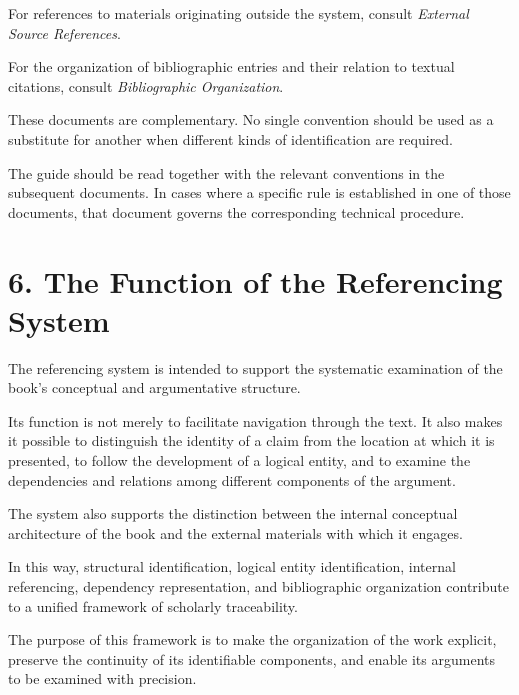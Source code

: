 For references to materials originating
outside the system, consult
\textit{External Source References}.

For the organization of bibliographic
entries and their relation to textual
citations, consult
\textit{Bibliographic Organization}.

These documents are complementary.
No single convention should be used
as a substitute for another when
different kinds of identification
are required.

The guide should be read together
with the relevant conventions in
the subsequent documents. In cases
where a specific rule is established
in one of those documents, that
document governs the corresponding
technical procedure.


\section*{6. The Function of the Referencing System}

The referencing system is intended
to support the systematic examination
of the book's conceptual and argumentative
structure.

Its function is not merely to facilitate
navigation through the text. It also
makes it possible to distinguish the
identity of a claim from the location
at which it is presented, to follow
the development of a logical entity,
and to examine the dependencies and
relations among different components
of the argument.

The system also supports the distinction
between the internal conceptual
architecture of the book and the
external materials with which it
engages.

In this way, structural identification,
logical entity identification, internal
referencing, dependency representation,
and bibliographic organization contribute
to a unified framework of scholarly
traceability.

The purpose of this framework is to
make the organization of the work
explicit, preserve the continuity
of its identifiable components, and
enable its arguments to be examined
with precision.

\cleardoublepage

